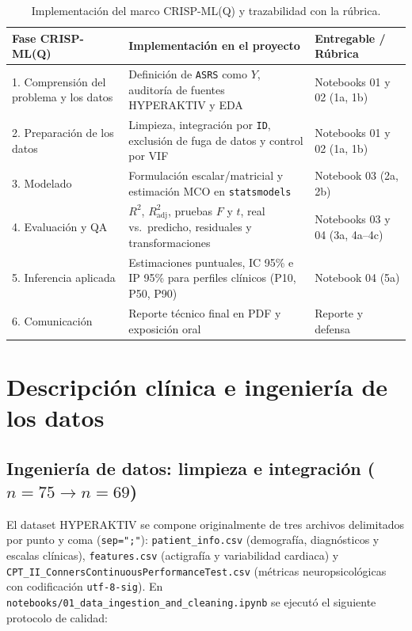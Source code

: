 \documentclass[11pt,letterpaper]{article}
\begin{document}
\begin{table}[H]
  \centering
  \caption{Implementación del marco CRISP-ML(Q) y trazabilidad con la rúbrica.}
  \label{tab:crisp}
  \small
  \begin{tabular}{p{4.3cm} p{6.8cm} p{3.8cm}}
    \toprule
    \textbf{Fase CRISP-ML(Q)} & \textbf{Implementación en el proyecto} & \textbf{Entregable / Rúbrica} \\
    \midrule
    1. Comprensión del problema y los datos & Definición de \texttt{ASRS} como $Y$, auditoría de fuentes HYPERAKTIV y EDA & Notebooks 01 y 02 (1a, 1b) \\
    2. Preparación de los datos & Limpieza, integración por \texttt{ID}, exclusión de fuga de datos y control por VIF & Notebooks 01 y 02 (1a, 1b) \\
    3. Modelado & Formulación escalar/matricial y estimación MCO en \texttt{statsmodels} & Notebook 03 (2a, 2b) \\
    4. Evaluación y QA & $R^2$, $R^2_{\text{adj}}$, pruebas $F$ y $t$, real vs.\ predicho, residuales y transformaciones & Notebooks 03 y 04 (3a, 4a--4c) \\
    5. Inferencia aplicada & Estimaciones puntuales, IC 95\% e IP 95\% para perfiles clínicos (P10, P50, P90) & Notebook 04 (5a) \\
    6. Comunicación & Reporte técnico final en PDF y exposición oral & Reporte y defensa \\
    \bottomrule
  \end{tabular}
\end{table}

\section{Descripción clínica e ingeniería de los datos}

\subsection{Ingeniería de datos: limpieza e integración ($n = 75 \rightarrow n = 69$)}

El dataset HYPERAKTIV se compone originalmente de tres archivos delimitados por punto y coma (\texttt{sep=";"}): \texttt{patient\_info.csv} (demografía, diagnósticos y escalas clínicas), \texttt{features.csv} (actigrafía y variabilidad cardiaca) y \texttt{CPT\_II\_ConnersContinuousPerformanceTest.csv} (métricas neuropsicológicas con codificación \texttt{utf-8-sig}). En \texttt{notebooks/01\_data\_ingestion\_and\_cleaning.ipynb} se ejecutó el siguiente protocolo de calidad:
\end{document}
